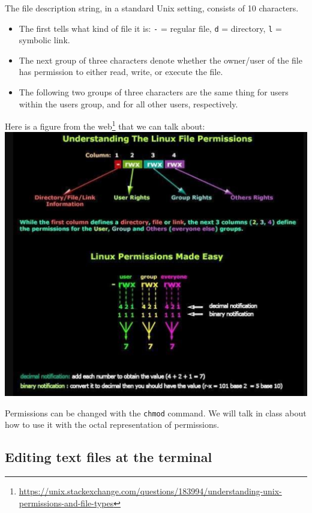 \documentclass[]{krantz}
\providecommand{\tightlist}{%
  \setlength{\itemsep}{0pt}\setlength{\parskip}{0pt}}
\renewcommand{\href}[2]{#2\footnote{\url{#1}}}
\begin{document}
The file description string, in a standard Unix setting, consists of 10 characters.

\begin{itemize}
\tightlist
\item
  The first tells what kind of file it is: \texttt{-} = regular file, \texttt{d} = directory, \texttt{l} = symbolic link.
\item
  The next group of three characters denote whether the owner/user of the file has
  permission to either read, write, or execute the file.\\
\item
  The following two groups of three characters are the same thing for users within the
  users group, and for all other users, respectively.
\end{itemize}

Here is a figure from \href{https://unix.stackexchange.com/questions/183994/understanding-unix-permissions-and-file-types}{the web} that we can talk about:
\includegraphics{figs/permissions.pdf}

Permissions can be changed with the \texttt{chmod} command. We will talk in class about
how to use it with the octal representation of permissions.

\hypertarget{editing-text-files-at-the-terminal}{%
\subsection{Editing text files at the terminal}\label{editing-text-files-at-the-terminal}}
\end{document}
